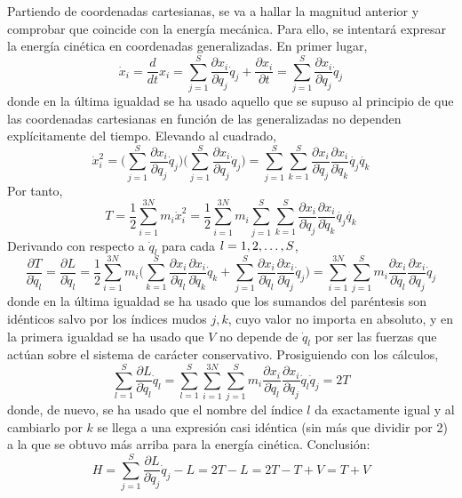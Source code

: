 \documentclass[12pt]{report}
\begin{document}
\vspace{2mm}
Partiendo de coordenadas cartesianas, se va a hallar la magnitud anterior y comprobar que coincide con la energía mecánica. Para ello, se intentará expresar la energía cinética en coordenadas generalizadas. En primer lugar,
\[\dot{x}_i = \frac{d}{dt}x_i =\sum_{j=1}^S \frac{\partial x_i}{\partial q_j} \dot{q}_j + \frac{\partial x_i}{\partial t} =\sum_{j=1}^S \frac{\partial x_i}{\partial q_j} \dot{q}_j\]
donde en la última igualdad se ha usado aquello que se supuso al principio de que las coordenadas cartesianas en función de las generalizadas no dependen explícitamente del tiempo. Elevando al cuadrado,
\[\dot{x}_i^2 = \biggl(\sum_{j=1}^S \frac{\partial x_i}{\partial q_j} \dot{q}_j \biggr)\biggl(\sum_{j=1}^S \frac{\partial x_i}{\partial q_j} \dot{q}_j \biggr) = \sum_{j=1}^S \sum_{k=1}^S \frac{\partial x_i}{\partial \dot{q}_j} \frac{\partial x_i}{\partial \dot{q}_k} \dot{q_j} \dot{q_k}\]
Por tanto,
\[T = \frac{1}{2}\sum_{i=1}^{3N}m_i\dot{x}_i^2 = \frac{1}{2}\sum_{i=1}^{3N}m_i \sum_{j=1}^S \sum_{k=1}^S \frac{\partial x_i}{\partial \dot{q}_j} \frac{\partial x_i}{\partial \dot{q}_k} \dot{q_j} \dot{q_k}\]
Derivando con respecto a $\dot{q}_l$ para cada $l = 1,2,\mathellipsis,S$,
\[\frac{\partial T}{\partial \dot{q}_l}=\frac{\partial L}{\partial \dot{q}_l} = \frac{1}{2}\sum_{i=1}^{3N}m_i\biggl( \sum_{k=1}^S \frac{\partial x_i}{\partial\dot{q}_l}\frac{\partial x_i}{\partial \dot{q}_k} \dot{q}_k + \sum_{j=1}^S \frac{\partial x_i}{\partial\dot{q}_l}\frac{\partial x_i}{\partial \dot{q}_j} \dot{q}_j \biggr) = \sum_{i=1}^{3N} \sum_{j=1}^S m_i \frac{\partial x_i}{\partial\dot{q}_l}\frac{\partial x_i}{\partial \dot{q}_j} \dot{q}_j\]
donde en la última igualdad se ha usado que los sumandos del paréntesis son idénticos salvo por los índices mudos $j,k$, cuyo valor no importa en absoluto, y en la primera igualdad se ha usado que $V$ no depende de $\dot{q}_l$ por ser las fuerzas que actúan sobre el sistema de carácter conservativo. Prosiguiendo con los cálculos,
\[\sum_{l=1}^S \frac{\partial L }{\partial \dot{q}_l}\dot{q}_l = \sum_{l = 1}^S \sum_{i=1}^{3N} \sum_{j=1}^S m_i \frac{\partial x_i}{\partial\dot{q}_l}\frac{\partial x_i}{\partial \dot{q}_j} \dot{q}_l \dot{q}_j = 2T\]
donde, de nuevo, se ha usado que el nombre del índice $l$ da exactamente igual y al cambiarlo por $k$ se llega a una expresión casi idéntica (sin más que dividir por 2) a la que se obtuvo más arriba para la energía cinética. Conclusión:
\[H =  \sum_{j=1}^S {\frac{\partial L}{\partial \dot{q}_j}} \dot{q}_j - L = 2T - L = 2T-T+V = T+V \]
\end{document}
